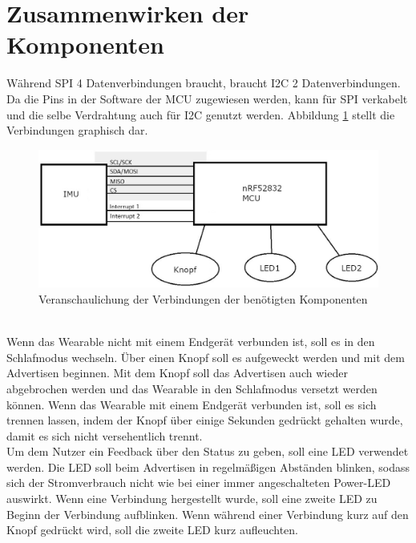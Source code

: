 \section{Zusammenwirken der Komponenten}
Während SPI 4 Datenverbindungen braucht, braucht I2C 2 Datenverbindungen.
Da die Pins in der Software der MCU zugewiesen werden, kann für SPI verkabelt und die selbe Verdrahtung auch für I2C genutzt werden.
Abbildung \ref{fig:abstract_schema} stellt die Verbindungen graphisch dar.
\begin{figure}[h]
	\centering
	\includegraphics[width=0.9\linewidth]{res/schemaAbstrakt.jpg}
	\caption{Veranschaulichung der Verbindungen der benötigten Komponenten}
	\label{fig:abstract_schema}
\end{figure}\\
Wenn das Wearable nicht mit einem Endgerät verbunden ist, soll es in den Schlafmodus wechseln.
Über einen Knopf soll es aufgeweckt werden und mit dem Advertisen beginnen.
Mit dem Knopf soll das Advertisen auch wieder abgebrochen werden und das Wearable in den Schlafmodus versetzt werden können.
Wenn das Wearable mit einem Endgerät verbunden ist, soll es sich trennen lassen, indem der Knopf über einige Sekunden gedrückt gehalten wurde, damit es sich nicht versehentlich trennt.\\
Um dem Nutzer ein Feedback über den Status zu geben, soll eine LED verwendet werden.
Die LED soll beim Advertisen in regelmäßigen Abständen blinken, sodass sich der Stromverbrauch nicht wie bei einer immer angeschalteten Power-LED auswirkt.
Wenn eine Verbindung hergestellt wurde, soll eine zweite LED zu Beginn der Verbindung aufblinken.
Wenn während einer Verbindung kurz auf den Knopf gedrückt wird, soll die zweite LED kurz aufleuchten.

